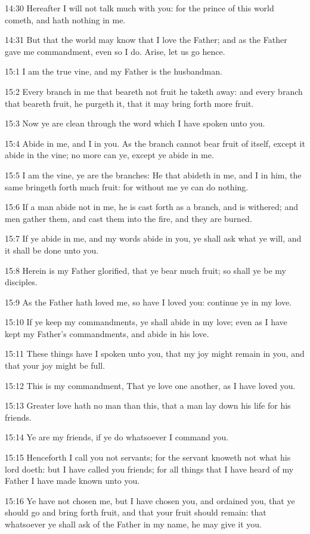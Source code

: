 14:30 Hereafter I will not talk much with you: for the prince of this world cometh, and hath nothing in me.

14:31 But that the world may know that I love the Father; and as the Father gave me commandment, even so I do. Arise, let us go hence.

15:1 I am the true vine, and my Father is the husbandman.

15:2 Every branch in me that beareth not fruit he taketh away: and every branch that beareth fruit, he purgeth it, that it may bring forth more fruit.

15:3 Now ye are clean through the word which I have spoken unto you.

15:4 Abide in me, and I in you. As the branch cannot bear fruit of itself, except it abide in the vine; no more can ye, except ye abide in me.

15:5 I am the vine, ye are the branches: He that abideth in me, and I in him, the same bringeth forth much fruit: for without me ye can do nothing.

15:6 If a man abide not in me, he is cast forth as a branch, and is withered; and men gather them, and cast them into the fire, and they are burned.

15:7 If ye abide in me, and my words abide in you, ye shall ask what ye will, and it shall be done unto you.

15:8 Herein is my Father glorified, that ye bear much fruit; so shall ye be my disciples.

15:9 As the Father hath loved me, so have I loved you: continue ye in my love.

15:10 If ye keep my commandments, ye shall abide in my love; even as I have kept my Father's commandments, and abide in his love.

15:11 These things have I spoken unto you, that my joy might remain in you, and that your joy might be full.

15:12 This is my commandment, That ye love one another, as I have loved you.

15:13 Greater love hath no man than this, that a man lay down his life for his friends.

15:14 Ye are my friends, if ye do whatsoever I command you.

15:15 Henceforth I call you not servants; for the servant knoweth not what his lord doeth: but I have called you friends; for all things that I have heard of my Father I have made known unto you.

15:16 Ye have not chosen me, but I have chosen you, and ordained you, that ye should go and bring forth fruit, and that your fruit should remain: that whatsoever ye shall ask of the Father in my name, he may give it you.

